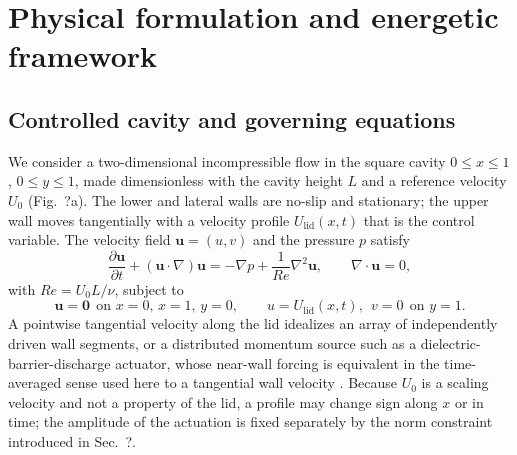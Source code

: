 \documentclass[11pt,a4paper]{article}
\newenvironment{chgdel}{\par\color{red}}{\par\color{black}}
\begin{document}
\section{Physical formulation and energetic framework}
\label{sec:formulation}

\subsection{Controlled cavity and governing equations}

\begin{chgdel}
We consider a two-dimensional incompressible flow in the square cavity
$0\le x\le 1$, $0\le y\le 1$, made dimensionless with the cavity height $L$ and a
reference velocity $U_0$ (Fig.~?a). The lower and lateral walls are no-slip and stationary;
the upper wall moves tangentially with a velocity profile
$U_{\mathrm{lid}}(x,t)$ that is the control variable. The velocity field
$\mathbf{u}=(u,v)$ and the pressure $p$ satisfy
\begin{equation}
\frac{\partial\mathbf{u}}{\partial t}+(\mathbf{u}\cdot\nabla)\mathbf{u}
=-\nabla p+\frac{1}{Re}\nabla^{2}\mathbf{u},
\qquad \nabla\cdot\mathbf{u}=0,
\end{equation}
with $Re=U_0L/\nu$, subject to
\begin{equation}
\mathbf{u}=\mathbf{0}\ \ \text{on } x=0,\,x=1,\,y=0,
\qquad
u=U_{\mathrm{lid}}(x,t),\ \ v=0\ \ \text{on } y=1 .
\end{equation}
A pointwise tangential velocity along the lid idealizes an array of independently
driven wall segments, or a distributed momentum source such as a
dielectric-barrier-discharge actuator, whose near-wall forcing is equivalent in
the time-averaged sense used here to a tangential wall velocity
. Because $U_0$ is a scaling velocity and not a property of
the lid, a profile may change sign along $x$ or in time; the amplitude of the
actuation is fixed separately by the norm constraint introduced in
Sec.~?.
\end{chgdel}
\end{document}
